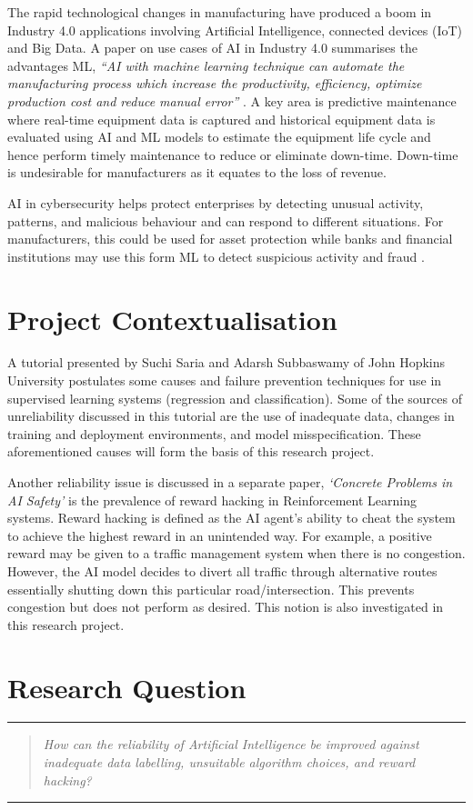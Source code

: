 The rapid technological changes in manufacturing have produced a boom 
in Industry 4.0 applications involving Artificial Intelligence, connected
 devices (IoT) and Big Data. A paper on use cases of AI in Industry 4.0 
 summarises the advantages ML, \textit{“AI with machine learning technique can 
 automate the manufacturing process which increase the productivity, 
 efficiency, optimize production cost and reduce manual error” }\cite{9004327}. A 
 key area is predictive maintenance where real-time equipment data is 
 captured and historical equipment data is evaluated using AI and ML 
 models to estimate the equipment life cycle and hence perform timely 
 maintenance to reduce or eliminate down-time. Down-time is undesirable
for manufacturers as it equates to the loss of revenue.

AI in cybersecurity helps protect enterprises by detecting unusual 
activity, patterns, and malicious behaviour and can respond to different 
situations. For manufacturers, this could be used for asset protection 
while banks and financial institutions may use this form ML to detect suspicious 
activity and fraud \cite{9004327}. 

\section{Project Contextualisation}
A tutorial presented by Suchi Saria and Adarsh Subbaswamy of John Hopkins University \cite{saria2019tutorial} postulates some causes and failure prevention techniques for use in supervised learning systems (regression and classification). 
Some of the sources of unreliability discussed in this tutorial are the use of inadequate data, changes in training and deployment environments, and model misspecification. 
These aforementioned causes will form the basis of this research project.

\enlargethispage{-\baselineskip}
Another reliability issue is discussed in a separate paper, \textit{‘Concrete Problems in AI Safety’} \cite{Amodei} is the prevalence of reward hacking in Reinforcement Learning systems. 
Reward hacking is defined as the AI agent’s ability to cheat the system to achieve the highest reward in an unintended way. 
For example, a positive reward may be given to a traffic management system when there is no congestion. However, the AI model decides to divert all traffic through alternative routes essentially shutting down this particular road/intersection. 
This prevents congestion but does not perform as desired. This notion is also investigated in this research project.

\section{Research Question}
\noindent\rule{\linewidth}{0.4pt}
\begin{quotation}
\textit{How can the reliability of Artificial Intelligence be improved against 
inadequate data labelling, unsuitable algorithm choices, and reward 
hacking?}
\end{quotation}
\noindent\rule{\linewidth}{0.4pt}